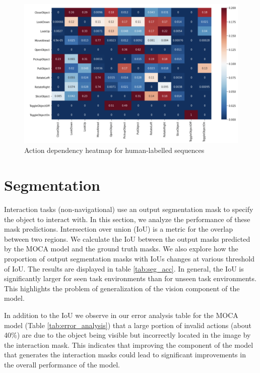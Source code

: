 \documentclass[11pt,a4paper]{article}
\begin{document}
 \begin{figure}
    \centering
    \includegraphics[width=\linewidth]{Reports/4-Analysis-of-Baselines/GROUND_codep.png}
    \caption{Action dependency heatmap for human-labelled sequences}
    \label{fig:GROUND_codep}
\end{figure}



\section{Segmentation}

Interaction tasks (non-navigational) use an output segmentation mask to specify the object to interact with. In this section, we analyze the performance of these mask predictions. Intersection over union (IoU) is a metric for the overlap between two regions. We calculate the IoU between the output masks predicted by the MOCA model and the ground truth masks. We also explore how the proportion of output segmentation masks with IoUs  changes at various threshold of IoU. The results are displayed in table \ref{tab:seg_acc}. In general, the IoU is significantly larger for seen task environments than for unseen task environments. This highlights the problem of generalization of the vision component of the model.

In addition to the IoU we observe in our error analysis table for the MOCA model (Table \ref{tab:error_analysis}) that a large portion of invalid actions (about 40\%) are due to the object being visible but incorrectly located in the image by the interaction mask. This indicates that improving the component of the model that generates the interaction masks could lead to significant improvements in the overall performance of the model.
\end{document}
